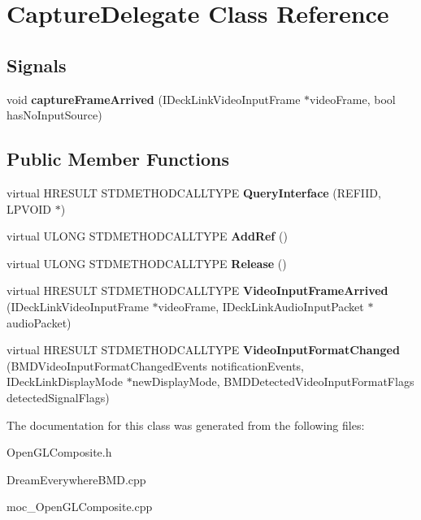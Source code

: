 \hypertarget{classCaptureDelegate}{
\section{CaptureDelegate Class Reference}
\label{classCaptureDelegate}
}
\subsection*{Signals}
\begin{DoxyCompactItemize}
\item 
\hypertarget{classCaptureDelegate_a99141e43070b7bcee71123d1e688867f}{
void {\bfseries captureFrameArrived} (IDeckLinkVideoInputFrame $\ast$videoFrame, bool hasNoInputSource)}
\label{classCaptureDelegate_a99141e43070b7bcee71123d1e688867f}

\end{DoxyCompactItemize}
\subsection*{Public Member Functions}
\begin{DoxyCompactItemize}
\item 
\hypertarget{classCaptureDelegate_a62f27b4776e6a3621c4c7f1b8ec0a35f}{
virtual HRESULT STDMETHODCALLTYPE {\bfseries QueryInterface} (REFIID, LPVOID $\ast$)}
\label{classCaptureDelegate_a62f27b4776e6a3621c4c7f1b8ec0a35f}

\item 
\hypertarget{classCaptureDelegate_a24510dcbcfc85d855a3d6ce2ee9b0ea9}{
virtual ULONG STDMETHODCALLTYPE {\bfseries AddRef} ()}
\label{classCaptureDelegate_a24510dcbcfc85d855a3d6ce2ee9b0ea9}

\item 
\hypertarget{classCaptureDelegate_af0390f11be146651aa58e71a67d86ae3}{
virtual ULONG STDMETHODCALLTYPE {\bfseries Release} ()}
\label{classCaptureDelegate_af0390f11be146651aa58e71a67d86ae3}

\item 
\hypertarget{classCaptureDelegate_aae83bfd29866e2c41388f6e67a01220c}{
virtual HRESULT STDMETHODCALLTYPE {\bfseries VideoInputFrameArrived} (IDeckLinkVideoInputFrame $\ast$videoFrame, IDeckLinkAudioInputPacket $\ast$audioPacket)}
\label{classCaptureDelegate_aae83bfd29866e2c41388f6e67a01220c}

\item 
\hypertarget{classCaptureDelegate_a475e348f1a3aed3bee53f48f96ff2170}{
virtual HRESULT STDMETHODCALLTYPE {\bfseries VideoInputFormatChanged} (BMDVideoInputFormatChangedEvents notificationEvents, IDeckLinkDisplayMode $\ast$newDisplayMode, BMDDetectedVideoInputFormatFlags detectedSignalFlags)}
\label{classCaptureDelegate_a475e348f1a3aed3bee53f48f96ff2170}

\end{DoxyCompactItemize}


The documentation for this class was generated from the following files:\begin{DoxyCompactItemize}
\item 
OpenGLComposite.h\item 
DreamEverywhereBMD.cpp\item 
moc\_\-OpenGLComposite.cpp\end{DoxyCompactItemize}
